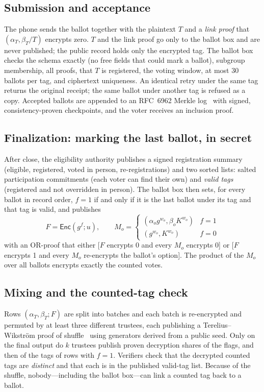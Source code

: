\documentclass[runningheads]{llncs}
\newcommand{\Enc}{\mathsf{Enc}}
\begin{document}
\subsection{Submission and acceptance}
The phone sends the ballot together with the plaintext $T$ and a \emph{link proof} that $(\alpha_T, \beta_T/T)$ encrypts zero. $T$ and the link proof go only to the ballot box and are never published; the public record holds only the encrypted tag. The ballot box checks the schema exactly (no free fields that could mark a ballot), subgroup membership, all proofs, that $T$ is registered, the voting window, at most 30 ballots per tag, and ciphertext uniqueness. An identical retry under the same tag returns the original receipt; the same ballot under another tag is refused as a copy. Accepted ballots are appended to an RFC~6962 Merkle log~\cite{rfc6962,rfc9162} with signed, consistency-proven checkpoints, and the voter receives an inclusion proof.

\subsection{Finalization: marking the last ballot, in secret}
After close, the eligibility authority publishes a signed registration summary (eligible, registered, voted in person, re-registrations) and two sorted lists: salted participation commitments (each voter can find their own) and \emph{valid tags} (registered and not overridden in person). The ballot box then sets, for every ballot in record order, $f=1$ if and only if it is the last ballot under its tag and that tag is valid, and publishes
\[
F = \Enc(g^f; u), \qquad M_o = \begin{cases} (\alpha_o g^{w_o}, \beta_o K^{w_o}) & f=1 \\ (g^{w_o}, K^{w_o}) & f=0 \end{cases}
\]
with an OR-proof that either [$F$ encrypts 0 and every $M_o$ encrypts 0] or [$F$ encrypts 1 and every $M_o$ re-encrypts the ballot's option]. The product of the $M_o$ over all ballots encrypts exactly the counted votes.

\subsection{Mixing and the counted-tag check}
Rows $(\alpha_T,\beta_T; F)$ are split into batches and each batch is re-encrypted and permuted by at least three different trustees, each publishing a Terelius--Wikstr{\"o}m proof of shuffle~\cite{terelius2010} using generators derived from a public seed. Only on the final output do $k$ trustees publish proven decryption shares of the flags, and then of the tags of rows with $f=1$. Verifiers check that the decrypted counted tags are \emph{distinct} and that each is in the published valid-tag list. Because of the shuffle, nobody---including the ballot box---can link a counted tag back to a ballot.
\end{document}

